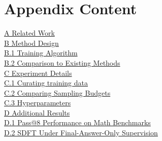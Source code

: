 \section*{Appendix Content}
\vspace{0.5em}
\noindent
\hyperref[sec:related]{A \hspace{0.5em} Related Work} \dotfill \pageref{sec:related} \\[6pt]
%
\hyperref[app:methoddesign]{B \hspace{0.5em} Method Design} \dotfill \pageref{app:methoddesign} \\[2pt]
\hyperref[app:methoddesign]{\hspace{1.7em} B.1 \hspace{0.5em} \ours{} Training Algorithm} \dotfill \pageref{app:methoddesign} \\[2pt]
\hyperref[app:methoddesign]{\hspace{1.7em} B.2 \hspace{0.5em} Comparison to Existing Methods} \dotfill \pageref{app:methoddesign} \\[6pt]
%
\hyperref[app:training-data]{C \hspace{0.5em} Experiment Details} \dotfill \pageref{app:training-data} \\[2pt]
\hyperref[app:training-data]{\hspace{1.7em} C.1 \hspace{0.5em} Curating \ours{} training data} \dotfill \pageref{app:training-data} \\[2pt]
\hyperref[app:compare-budget]{\hspace{1.7em} C.2 \hspace{0.5em} Comparing Sampling Budgets} \dotfill \pageref{app:compare-budget} \\[2pt]
\hyperref[app:hyperparameters]{\hspace{1.7em} C.3 \hspace{0.5em} Hyperparameters} \dotfill \pageref{app:hyperparameters} \\[6pt]
%
\hyperref[app:additionalresults]{D \hspace{0.5em} Additional Results} \dotfill \pageref{app:additionalresults} \\[2pt]
\hyperref[app:additionalresults]{\hspace{1.7em} D.1 \hspace{0.5em} Pass@8 Performance on Math Benchmarks} \dotfill \pageref{app:additionalresults} \\[2pt]
\hyperref[app:revision-token-tradeoff]{\hspace{1.7em} D.2 \hspace{0.5em} SDFT Under Final-Answer-Only Supervision} \dotfill \pageref{app:sdsf-final-answers} \\[2pt]
